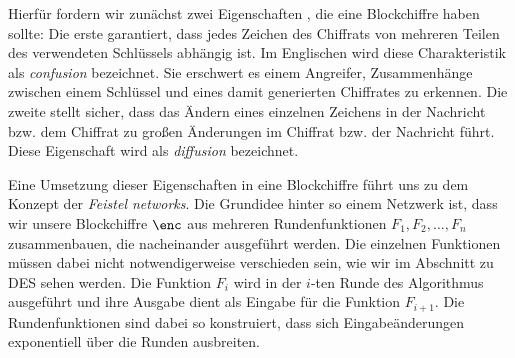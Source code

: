 Hierfür fordern wir zunächst zwei Eigenschaften \cite{Shannon1949}, die eine Blockchiffre haben sollte:
Die erste garantiert, dass jedes Zeichen des Chiffrats von mehreren Teilen des verwendeten Schlüssels abhängig ist. Im Englischen wird diese Charakteristik als \emph{confusion} bezeichnet. Sie erschwert es einem Angreifer, Zusammenhänge zwischen einem Schlüssel und eines damit generierten Chiffrates zu erkennen. 
Die zweite stellt sicher, dass das Ändern eines einzelnen Zeichens in der Nachricht bzw. dem Chiffrat zu großen Änderungen im Chiffrat bzw. der Nachricht führt. Diese Eigenschaft wird als \emph{diffusion} bezeichnet.

Eine Umsetzung dieser Eigenschaften in eine Blockchiffre führt uns zu dem Konzept der \emph{Feistel networks}.
Die Grundidee hinter so einem Netzwerk ist, dass wir unsere Blockchiffre \(\enc\) aus mehreren Rundenfunktionen \(F_1, F_2,\dots, F_n\) zusammenbauen, die nacheinander ausgeführt werden. Die einzelnen Funktionen müssen dabei nicht notwendigerweise verschieden sein, wie wir im Abschnitt zu DES sehen werden. Die Funktion \(F_i\) wird in der $i$-ten Runde des Algorithmus ausgeführt und ihre Ausgabe dient als Eingabe für die Funktion \(F_{i+1}\). Die Rundenfunktionen sind dabei so konstruiert, dass sich Eingabeänderungen exponentiell über die Runden ausbreiten.

